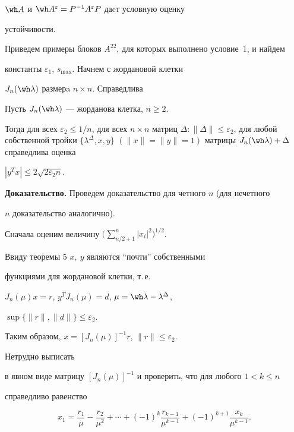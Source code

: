 $\wh A$ и $\wh A^{\varepsilon}=P^{-1}A^{\varepsilon}P$ даcт условную оценку


устойчивости.





Приведем примеры блоков $A^{22}$, для которых выполнено условие~1, и найдем


константы $\varepsilon_1$, $s_{\max}$. Начнем с жордановой клетки


$J_n(\wh\lambda)$ размерa $n\times n$. Справедлива





\begin{lem}


Пусть $J_n(\wh\lambda)$ --- жорданова клетка, $n\ge 2$.


Тогда для всех $\varepsilon_2\le 1/n$, для всех $n\times n$ матриц $\Delta:


\|\Delta\|\le \varepsilon_2$, для любой собственной тройки  $\{\lambda^{\Delta},


x,y\}$ $(\|x\|=\|y\|=1)$ матрицы $J_n(\wh\lambda)+\Delta$ справедлива оценка


$|y^T x|\le 2\sqrt{2\varepsilon_2 n}$.


\end{lem}





{\bf Доказательство.} Проведем доказательство для четного $n$ (для нечетного


$n$ доказательство аналогично).


Сначала оценим величину $\Big(\sum\limits_{n/2+1}^n |x_i|^2\Big)^{1/2}$.





Ввиду теоремы 5\; $x,\ y$ являются ``почти'' собственными


функциями для жордановой клетки, т.\,е.


$J_n(\mu)x=r$, $y^T J_n(\mu)= d$, $\mu=\wh\lambda-\lambda^{\Delta}$,


$\sup\{\|r\|,\|d\|\}\le \varepsilon_2$.


Таким образом, $x=[J_n(\mu)]^{-1}r$, $\|r\|\le \varepsilon_2$.


Нетрудно выписать


в явном виде матрицу $[J_n(\mu)]^{-1}$ и проверить, что для любого $1<k\le n$


справедливо равенство


\begin{equation}


x_1=\frac{r_1}{\mu}-\frac{r_2}{\mu^2}+\dotsb+(-1)^k\frac{r_{k-1}}{\mu^{k-1}}


+(-1)^{k+1} \frac{x_k}{\mu^{k-1}}.


\end{equation}





